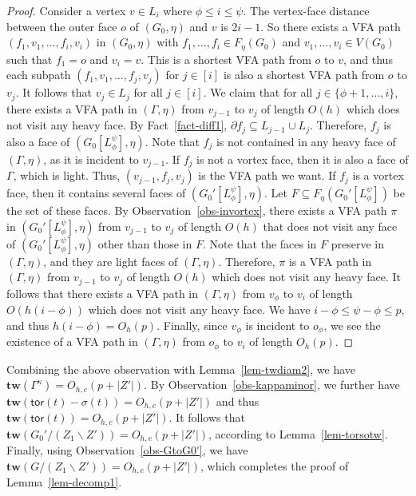 \documentclass[a4paper,11pt]{article}
\numberwithin{lemma}{section}
\newcommand{\tw}{\mathbf{tw}}
\newcommand{\tor}{\mathsf{tor}}
\begin{document}
\begin{proof}
Consider a vertex $v \in L_i$ where $\phi \leq i \leq \psi$.
The vertex-face distance between the outer face $o$ of $(G_0,\eta)$ and $v$ is $2i-1$.
So there exists a VFA path $(f_1,v_1,\dots,f_i,v_i)$ in $(G_0,\eta)$ with $f_1,\dots,f_i \in F_\eta(G_0)$ and $v_1,\dots,v_i \in V(G_0)$ such that $f_1 = o$ and $v_i = v$.
This is a shortest VFA path from $o$ to $v$, and thus each subpath $(f_1,v_1,\dots,f_j,v_j)$ for $j \in [i]$ is also a shortest VFA path from $o$ to $v_j$.
It follows that $v_j \in L_j$ for all $j \in [i]$.
We claim that for all $j \in \{\phi+1,\dots,i\}$, there exists a VFA path in $(\varGamma,\eta)$ from $v_{j-1}$ to $v_j$ of length $O(h)$ which does not visit any heavy face.
By Fact~\ref{fact-diff1}, $\partial f_j \subseteq L_{j-1} \cup L_j$.
Therefore, $f_j$ is also a face of $(G_0[L_\phi^\psi],\eta)$.
Note that $f_j$ is not contained in any heavy face of $(\varGamma,\eta)$, as it is incident to $v_{j-1}$.
If $f_j$ is not a vortex face, then it is also a face of $\varGamma$, which is light.
Thus, $(v_{j-1},f_j,v_j)$ is the VFA path we want.
If $f_j$ is a vortex face, then it contains several faces of $(G_0'[L_\phi^\psi],\eta)$.
Let $F \subseteq F_\eta(G_0'[L_\phi^\psi])$ be the set of these faces.
By Observation~\ref{obs-invortex}, there exists a VFA path $\pi$ in $(G_0'[L_\phi^\psi],\eta)$ from $v_{j-1}$ to $v_j$ of length $O(h)$ that does not visit any face of $(G_0'[L_\phi^\psi],\eta)$ other than those in $F$.
Note that the faces in $F$ preserve in $(\varGamma,\eta)$, and they are light faces of $(\varGamma,\eta)$.
Therefore, $\pi$ is a VFA path in $(\varGamma,\eta)$ from $v_{j-1}$ to $v_j$ of length $O(h)$ which does not visit any heavy face.
It follows that there exists a VFA path in $(\varGamma,\eta)$ from $v_\phi$ to $v_i$ of length $O(h(i-\phi))$ which does not visit any heavy face.
We have $i-\phi \leq \psi - \phi \leq p$, and thus $h(i-\phi) = O_h(p)$.
Finally, since $v_\phi$ is incident to $o_\phi$, we see the existence of a VFA path in $(\varGamma,\eta)$ from $o_\phi$ to $v_i$ of length $O_h(p)$.
\end{proof}

Combining the above observation with Lemma~\ref{lem-twdiam2}, we have $\tw(\varGamma^\kappa) = O_{h,c}(p+|Z'|)$.
By Observation~\ref{obs-kappaminor}, we further have $\tw(\tor(t) - \sigma(t)) = O_{h,c}(p+|Z'|)$ and thus $\tw(\tor(t)) = O_{h,c}(p+|Z'|)$.
It follows that $\tw(G_0'/(Z_1 \backslash Z')) = O_{h,c}(p+|Z'|)$, according to Lemma~\ref{lem-torsotw}.
Finally, using Observation~\ref{obs-GtoG0'}, we have $\tw(G/(Z_1 \backslash Z')) = O_{h,c}(p+|Z'|)$, which completes the proof of Lemma~\ref{lem-decomp1}.
 
\end{document}
